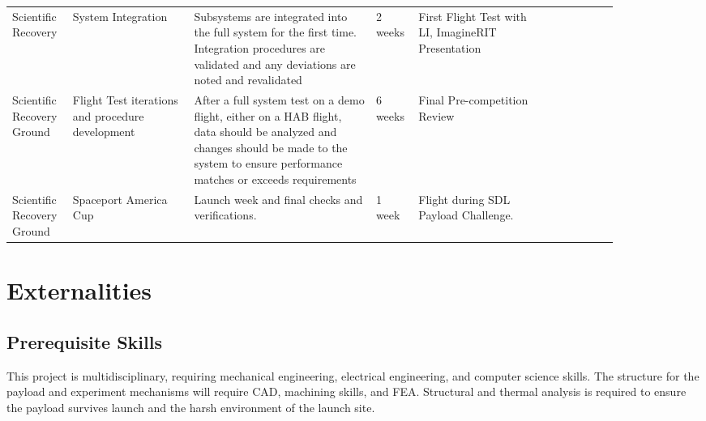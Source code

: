 \documentclass[conference]{IEEEtran} %
\begin{document}
\begin{table*}[b]
\begin{tabular}{p{0.1\linewidth} p{0.2\linewidth} p{0.3\linewidth} p{0.07\linewidth} p{0.2\linewidth} l}
    		\addlinespace[.25cm]
    		Scientific Recovery        & System Integration                               & Subsystems are integrated into the full system for the first time. Integration procedures are validated and any deviations are noted and revalidated                                                                                                                                                                      & 2 weeks       & First Flight Test with LI, ImagineRIT Presentation \\
    		\addlinespace[.25cm]
    		Scientific Recovery Ground & Flight Test iterations and procedure development & After a full system test on a demo flight, either on a HAB flight, data should be analyzed and changes should be made to the system to ensure performance matches or exceeds requirements                                                                                                                   & 6 weeks       & Final Pre-competition Review                       \\
    		\addlinespace[.25cm]
    		Scientific Recovery Ground & Spaceport America Cup                            & Launch week and final checks and verifications.                                                                                                                                                                                                                                                                           & 1 week        & Flight during SDL Payload Challenge. \\
    		\bottomrule
    		\end{tabular}
\label{tab:milestone}
\end{table*}

\section{Externalities}
\subsection{Prerequisite Skills}
This project is multidisciplinary, requiring mechanical engineering, electrical engineering, and computer science skills. The structure for the payload and experiment mechanisms will require CAD, machining skills, and FEA. Structural and thermal analysis is required to ensure the payload survives launch and the harsh environment of the launch site.
\end{document}
